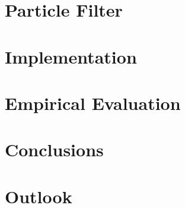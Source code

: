 \documentclass[12pt,a4paper,twoside,open=right,bibliography=totoc,BCOR=10mm]{scrreprt}
\begin{document}
\chapter{Particle Filter}
\label{ch:particle}


\chapter{Implementation}
\label{ch:impl}


\chapter{Empirical Evaluation}
\label{ch:eval}


\chapter{Conclusions}
\label{ch:conclusions}


\chapter{Outlook}
\label{ch:outlook}



\listoffigures
{}
\listoftables
{}
\listofalgorithms
{}

\printglossary[type=\acronymtype]

\printbibliography
\end{document}
